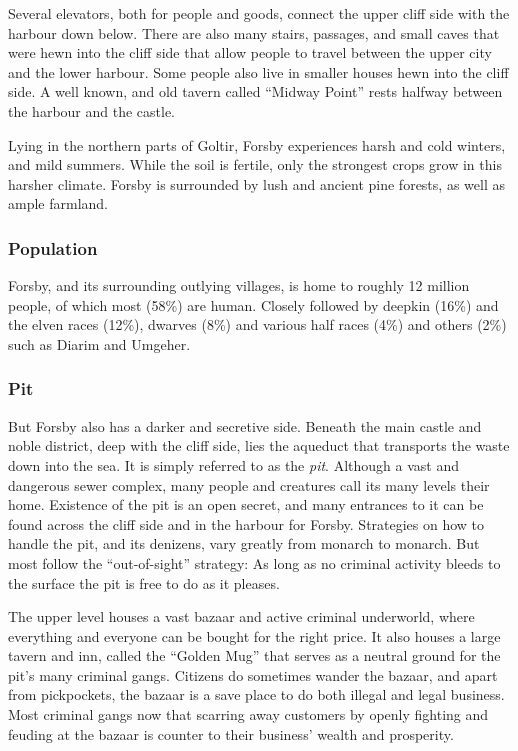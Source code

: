 Several elevators, both for people and goods, connect the upper cliff side
with the harbour down below. There are also many stairs, passages, and small
caves that were hewn into the cliff side that allow people to travel between
the upper city and the lower harbour. Some people also live in smaller houses
hewn into the cliff side. A well known, and old tavern called ``Midway Point''
rests halfway between the harbour and the castle.

Lying in the northern parts of Goltir, Forsby experiences harsh and cold
winters, and mild summers. While the soil is fertile, only the strongest crops
grow in this harsher climate. Forsby is surrounded by lush and ancient pine
forests, as well as ample farmland.

\subsubsection{Population}

Forsby, and its surrounding outlying villages, is home to roughly 12 million
people, of which most (58\%) are human. Closely followed by deepkin (16\%)
and the elven races (12\%), dwarves (8\%) and various half races (4\%) and
others (2\%) such as Diarim and Umgeher.

\subsubsection{Pit}
\label{sec:Pit}

But Forsby also has a darker and secretive side. Beneath the main castle and
noble district, deep with the cliff side, lies the aqueduct that transports
the waste down into the sea. It is simply referred to as the \emph{pit}.
Although a vast and dangerous sewer complex, many people and creatures call
its many levels their home. Existence of the pit is an open secret, and many
entrances to it can be found across the cliff side and in the harbour for
Forsby. Strategies on how to handle the pit, and its denizens, vary greatly
from monarch to monarch. But most follow the ``out-of-sight'' strategy: As
long as no criminal activity bleeds to the surface the pit is free to do as
it pleases.

The upper level houses a vast bazaar and active criminal underworld, where
everything and everyone can be bought for the right price. It also houses a
large tavern and inn, called the ``Golden Mug'' that serves as a neutral
ground for the pit's many criminal gangs. Citizens do sometimes wander the
bazaar, and apart from pickpockets, the bazaar is a save place to do both
illegal and legal business. Most criminal gangs now that scarring away
customers by openly fighting and feuding at the bazaar is counter to their
business' wealth and prosperity.

